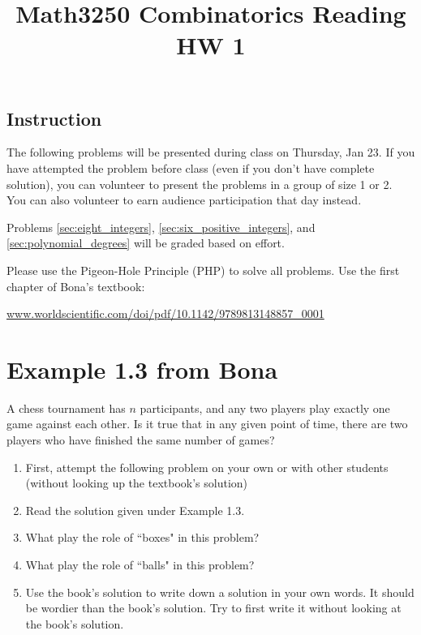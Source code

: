 \documentclass[10pt]{amsart}
\title{Math3250 Combinatorics Reading HW 1}
\begin{document}
\maketitle



\subsection*{Instruction}
The following problems will be presented during class on Thursday, Jan 23. 
If you have attempted the problem before class (even if you don't have complete solution), you can volunteer to present the problems in a group of size 1 or 2. 
You can also volunteer to earn audience participation that day instead. 


Problems \ref{sec:eight_integers}, \ref{sec:six_positive_integers}, and \ref{sec:polynomial_degrees} will be graded based on effort.

Please use the Pigeon-Hole Principle (PHP) to solve all problems. 
Use the first chapter of Bona's textbook:
\begin{footnotesize}
\href{https://www.worldscientific.com/doi/pdf/10.1142/9789813148857_0001}{www.worldscientific.com/doi/pdf/10.1142/9789813148857\_0001}
\end{footnotesize}



\bigskip




\section{Example 1.3 from Bona}
A chess tournament has $n$ participants, and any two players play exactly one game against each other. Is it true that in any given point of time, there are two players who have finished the same number of games?

\begin{enumerate}
\item 
First, attempt the following problem on your own or with other students (without looking up the textbook's solution)

\item Read the solution given under Example 1.3. 

\item What play the role of ``boxes" in this problem?

\item What play the role of ``balls" in this problem?

\item Use the book's solution to write down a solution in your own words. It should be wordier than the book's solution. Try to first write it without looking at the book's solution.
\end{enumerate}
\end{document}
